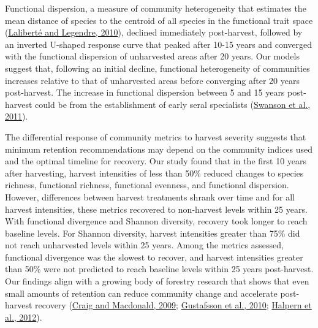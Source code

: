 \documentclass[
  12pt,
]{article}
\begin{document}
Functional dispersion, a measure of community heterogeneity that estimates the mean distance of species to the centroid of all species in the functional trait space (\protect\hyperlink{ref-laliberteDistanceBasedFramework2010}{Laliberté and Legendre, 2010}), declined immediately post-harvest, followed by an inverted U-shaped response curve that peaked after 10-15 years and converged with the functional dispersion of unharvested areas after 20 years. Our models suggest that, following an initial decline, functional heterogeneity of communities increases relative to that of unharvested areas before converging after 20 years post-harvest. The increase in functional dispersion between 5 and 15 years post-harvest could be from the establishment of early seral specialists (\protect\hyperlink{ref-swanson2011forgotten}{Swanson et al., 2011}).

The differential response of community metrics to harvest severity suggests that minimum retention recommendations may depend on the community indices used and the optimal timeline for recovery. Our study found that in the first 10 years after harvesting, harvest intensities of less than 50\% reduced changes to species richness, functional richness, functional evenness, and functional dispersion. However, differences between harvest treatments shrank over time and for all harvest intensities, these metrics recovered to non-harvest levels within 25 years. With functional divergence and Shannon diversity, recovery took longer to reach baseline levels. For Shannon diversity, harvest intensities greater than 75\% did not reach unharvested levels within 25 years. Among the metrics assessed, functional divergence was the slowest to recover, and harvest intensities greater than 50\% were not predicted to reach baseline levels within 25 years post-harvest. Our findings align with a growing body of forestry research that shows that even small amounts of retention can reduce community change and accelerate post-harvest recovery (\protect\hyperlink{ref-Craig2009}{Craig and Macdonald, 2009}; \protect\hyperlink{ref-gustafssonTreeRetentionConservation2010}{Gustafsson et al., 2010}; \protect\hyperlink{ref-Halpern2012}{Halpern et al., 2012}).
\end{document}
